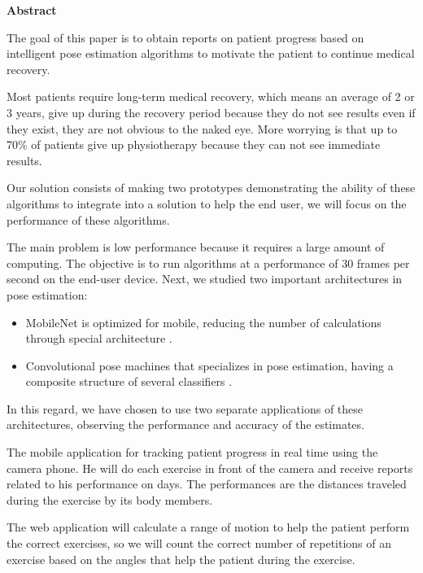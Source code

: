 \begin{center}
 \textbf{Abstract}
\end{center}
\vspace{0.4cm}

The goal of this paper is to obtain reports on patient progress based on intelligent pose estimation  algorithms to motivate the patient to continue medical recovery.

 Most patients require long-term medical recovery, which means an average of 2 or 3 years, give up during the recovery period because they do not see results even if they exist, they are not obvious to the naked eye.
More worrying is that up to 70\% of patients give up physiotherapy because they can not see immediate results.

Our solution consists of making two prototypes demonstrating the ability of these algorithms to integrate into a solution to help the end user, we will focus on the performance of these algorithms.

The main problem is low performance because it requires a large amount of computing.
The objective is to run algorithms at a performance of 30 frames per second on the end-user device.
Next, we studied two important architectures in pose estimation:
\begin{itemize}
    \item MobileNet is optimized for mobile, reducing the number of calculations through special architecture \cite{DBLP:journals/corr/HowardZCKWWAA17}.
    \item Convolutional pose machines that specializes in pose estimation, having a composite structure of several classifiers \cite{DBLP:journals/corr/WeiRKS16}.
\end{itemize}

In this regard, we have chosen to use two separate applications of these architectures, observing the performance and accuracy of the estimates.

The mobile application for tracking patient progress in real time using the camera phone.
He will do each exercise in front of the camera and receive reports related to his performance on days.
The performances are the distances traveled during the exercise by its body members.

The web application will calculate a range of motion to help the patient perform the correct exercises, so we will count the correct number of repetitions of an exercise based on the angles that help the patient during the exercise.

